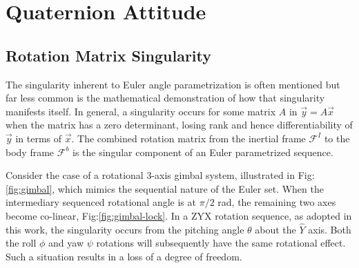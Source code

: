 \section{Quaternion Attitude}
\subsection{Rotation Matrix Singularity}\label{subsec:dynamics.rigidbody.singularity}
The singularity inherent to Euler angle parametrization is often mentioned but far less common is the mathematical demonstration of how that singularity manifests itself.  In general, a singularity occurs for some matrix $A$ in $\vec{y}=A\vec{x}$ when the matrix has a zero determinant, losing rank and hence differentiability of $\vec{y}$ in terms of $\vec{x}$. The combined rotation matrix from the inertial frame $\mathcal{F}^{I}$ to the body frame $\mathcal{F}^{b}$ is the singular component of an Euler parametrized sequence. 
\par
Consider the case of a rotational 3-axis gimbal system, illustrated in Fig:\ref{fig:gimbal}, which mimics the sequential nature of the Euler set. When the intermediary sequenced rotational angle is at $\pi/2$ rad, the remaining two axes become co-linear, Fig:\ref{fig:gimbal-lock}. In a ZYX rotation sequence, as adopted in this work, the singularity occurs from the pitching angle $\theta$ about the $\hat{Y}$ axis. Both the roll $\phi$ and yaw $\psi$ rotations will subsequently have the same rotational effect. Such a situation results in a loss of a degree of freedom.
\newpage
